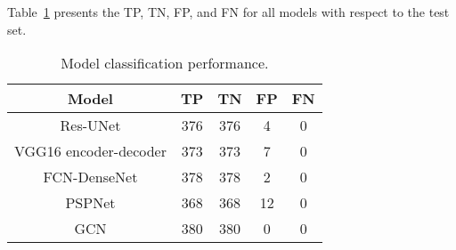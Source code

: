 Table~\ref{tab:table_performance} presents the TP, TN, FP, and FN for all models with respect to the test set.
\begin{table}[]
	\centering
	\caption{Model classification performance.}
	\label{tab:table_performance}
	\begin{tabular}{ccccc} \hline
		Model& TP & TN & FP & FN \\ \hline
		Res-UNet & 376 & 376 & 4 & 0 \\ 
		VGG16 encoder-decoder & 373 & 373 & 7 & 0 \\ 
		FCN-DenseNet & 378 & 378 & 2 & 0 \\ 
		PSPNet & 368 & 368 & 12 & 0 \\ 
		GCN & 380 & 380 & 0 & 0 \\ \hline
	\end{tabular}	
\end{table}

